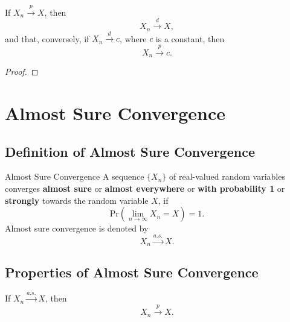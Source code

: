 \begin{theorem}{}{}
    If $X_{n}\stackrel{p}{\rightarrow}X$, then
    \begin{equation}
        X_{n}\stackrel{d}{\rightarrow}X,
    \end{equation}
    and that, conversely, if $X_{n}\stackrel{d}{\rightarrow}c$, where $c$ is a constant, then
    \begin{equation}
        X_{n}\stackrel{p}{\rightarrow}c.
    \end{equation}
\end{theorem}

\begin{proof}
    
\end{proof}

\section{Almost Sure Convergence}

\subsection{Definition of Almost Sure Convergence}

\begin{definition}{Almost Sure Convergence}{}
    A sequence $\{X_n\}$ of real-valued random variables converges \textbf{almost sure} or \textbf{almost everywhere} or \textbf{with probability 1} or \textbf{strongly} towards the random variable $X$, if
    \begin{equation}
        \text{Pr}\left(\lim_{n\to\infty}X_n=X\right)=1.
    \end{equation}
    Almost sure convergence is denoted by
    \begin{equation}
        X_n \stackrel{a.s.}{\rightarrow} X.
    \end{equation}
\end{definition}

\begin{note}
    
\end{note}

\subsection{Properties of Almost Sure Convergence}

\begin{theorem}{}{}
    If $X_{n}\stackrel{a.s.}{\rightarrow}X$, then
    \begin{equation}
        X_{n}\stackrel{p}{\rightarrow}X.
    \end{equation}
\end{theorem}

